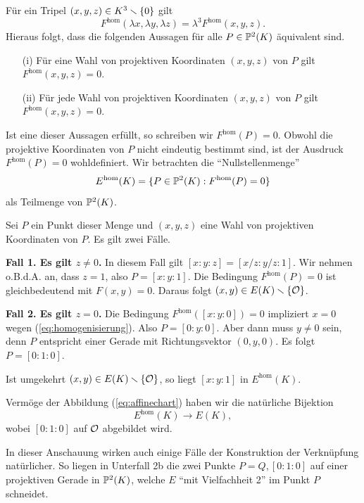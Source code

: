 Für ein Tripel $(x,y,z)\in K^3\smallsetminus\{0\}$ gilt
$$F^{\mathrm{hom}}(\lambda x,\lambda y,\lambda z)
=\lambda^3F^{\mathrm{hom}}(x,y,z).$$
Hieraus folgt, dass die folgenden Aussagen für alle $P\in {\mathbb{P}}^2(K)$
äquivalent  sind.
\begin{enumerate}
\item [(i)] Für eine Wahl von projektiven Koordinaten $(x,y,z)$ von
  $P$ gilt $  F^{\mathrm{hom}}(x,y,z) = 0$.
\item [(ii)] Für jede Wahl von projektiven Koordinaten $(x,y,z)$ von
  $P$ gilt $  F^{\mathrm{hom}}(x,y,z) = 0$.
\end{enumerate}
Ist eine dieser Aussagen erfüllt, so schreiben wir
$F^{\mathrm{hom}}(P)=0$. Obwohl die projektive Koordinaten von $P$
nicht eindeutig bestimmt sind, ist der Ausdruck
$F^{\mathrm{hom}}(P)=0$
wohldefiniert. 
Wir betrachten die ``Nullstellenmenge''
\begin{equation*}
  E^{\mathrm{hom}}(K) = \{P \in {\mathbb{P}}^2(K): F^{\mathrm{hom}}(P) = 0\}
\end{equation*}
als Teilmenge von ${\mathbb{P}}^2(K)$.

Sei $P$ ein Punkt dieser Menge und $(x,y,z)$ eine Wahl von projektiven
Koordinaten von $P$. Es gilt zwei Fälle.

\textbf{Fall 1. Es gilt $z\not=0$.} In diesem Fall gilt $[x:y:z] =
[x/z:y/z:1]$. Wir nehmen o.B.d.A. an, dass $z=1$, also $P=[x:y:1]$.
Die Bedingung $F^{\mathrm{hom}}(P)=0$ ist gleichbedeutend mit
$F(x,y)=0$. Daraus folgt
 $(x,y) \in E(K)\smallsetminus\{{\mathcal O}\}$.

\textbf{Fall 2. Es gilt $z=0$.} Die Bedingung
$F^{\mathrm{hom}}([x:y:0])=0$ impliziert
$x=0$ wegen (\ref{eq:homogenisierung}). Also $P = [0:y:0]$. Aber dann
muss $y\not=0$ sein, denn $P$ entspricht einer Gerade mit
Richtungsvektor $(0,y,0)$. Es folgt $P = [0:1:0]$.

Ist umgekehrt $(x,y)\in E(K)\smallsetminus\{{\mathcal O}\}$, so liegt $[x:y:1]$ in
$E^{\mathrm{hom}}(K)$.


Vermöge der Abbildung (\ref{eq:affinechart}) haben wir die natürliche
Bijektion 
\begin{equation*}
  E^{\mathrm{hom}}(K) \rightarrow E(K),
\end{equation*}
wobei $[0:1:0]$ auf ${\mathcal O}$ abgebildet wird. 

In dieser Anschauung wirken auch einige Fälle der Konstruktion der
Verknüpfung natürlicher. So liegen in  Unterfall 2b die zwei Punkte
$P=Q,[0:1:0]$ auf einer projektiven Gerade in ${\mathbb{P}}^2(K)$, welche $E$
``mit Vielfachheit 2'' im Punkt $P$ schneidet. 


